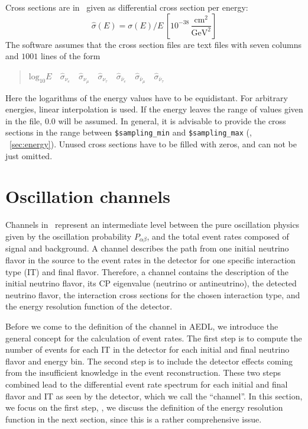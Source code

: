 Cross sections are in \GLOBES\ given as differential cross section per energy:
\begin{equation}
\hat\sigma(E)=\sigma(E)/E\,\left[ 10^{-38}\,
\frac{\mathrm{cm}^2}{\mathrm{GeV}^2} \right]
\end{equation}
The software assumes that the cross section files are text files with 
seven columns and $1001$ lines of the form
\begin{quotation}
$\mathrm{log}_{10} E\quad
\hat\sigma_{\nu_e}\quad
\hat\sigma_{\nu_\mu}\quad
\hat\sigma_{\nu_\tau}\quad
\hat\sigma_{\bar\nu_e}\quad
\hat\sigma_{\bar\nu_\mu}\quad
\hat\sigma_{\bar\nu_\tau}$
\end{quotation}
Here the logarithms of the energy values have to be equidistant. For 
arbitrary energies, linear interpolation is used. If the energy leaves the
range of values given in the file, $0.0$ will be assumed. In general, it is advisable to provide the cross sections in the range between {\tt \$sampling\_min} and {\tt \$sampling\_max} (\cf, \Sec~\ref{sec:energy}).
Unused cross sections have to be filled with zeros, and can not be just omitted.

\section{Oscillation channels}
\label{sec:channel}

Channels in \GLOBES\ represent an intermediate level 
between the pure oscillation physics given by the oscillation probability
$P_{\alpha\beta}$, and the total event rates composed of signal and 
background. A channel describes the path from one
initial neutrino flavor in the source to the event rates in the detector for one specific interaction type (IT) and final flavor.  
Therefore, a channel contains the description of the 
initial neutrino flavor, its CP eigenvalue (neutrino or antineutrino), 
the detected neutrino flavor, the interaction cross sections for the chosen interaction type, and the energy resolution function of the detector.

Before we come to the definition of the channel in AEDL, we introduce the general concept for the calculation of event rates. The first step is to
compute the number of events for each IT in the detector for each 
initial and final neutrino flavor and energy bin. The second step is to include the detector effects coming from the insufficient knowledge in the event reconstruction. These two steps combined lead to the differential event rate spectrum for each initial and final flavor and IT as seen by the detector, which we call the ``channel''. In this section, we focus on the
 first step, \ie , we discuss the definition of the energy resolution function in the next section, since this is a rather comprehensive issue.

